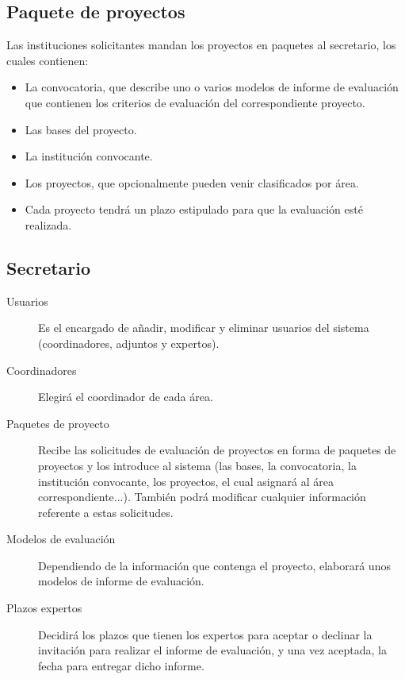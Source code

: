 \documentclass[11pt,a4paper,spanish,twoside]{book}
\begin{document}
\subsection{Paquete de proyectos}
Las instituciones solicitantes mandan los proyectos en paquetes al
secretario, los cuales contienen: 
\begin{itemize}
\item La convocatoria, que describe uno o varios modelos de informe de
  evaluación que contienen los criterios de evaluación del correspondiente
  proyecto. 
\item Las bases del proyecto.
\item La institución convocante.
\item Los proyectos, que opcionalmente pueden venir clasificados por área. 
\item Cada proyecto tendrá un plazo estipulado para que la evaluación esté
  realizada. 
\end{itemize}

\subsection{Secretario}
\begin{description}
\item[Usuarios] Es el encargado de añadir, modificar y eliminar 
  usuarios del sistema (coordinadores, adjuntos y expertos).
\item[Coordinadores] Elegirá el coordinador de cada área.
\item[Paquetes de proyecto] Recibe las solicitudes de evaluación de proyectos
  en forma de paquetes de proyectos y los introduce al sistema (las bases, la
  convocatoria, la institución convocante, los proyectos, el cual asignará al
  área correspondiente...). También podrá modificar cualquier información
  referente a estas solicitudes.  
\item[Modelos de evaluación] Dependiendo de la información que contenga el
  proyecto, elaborará unos modelos de informe de evaluación. 
\item[Plazos expertos] Decidirá los plazos que tienen los expertos para
  aceptar o declinar la invitación para realizar el informe de evaluación,
  y una vez aceptada, la fecha para entregar dicho informe.
\end{description}
\end{document}
